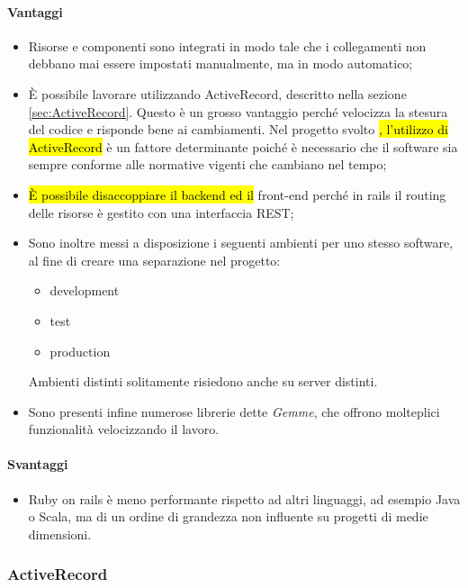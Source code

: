 \paragraph{Vantaggi}
\begin{itemize}
	\item Risorse e componenti sono integrati in modo tale che i collegamenti non debbano mai essere impostati manualmente, ma in modo automatico;
	\item È possibile lavorare utilizzando ActiveRecord, descritto nella sezione \ref{sec:ActiveRecord}. Questo è un grosso vantaggio perché velocizza la stesura del codice e risponde bene ai cambiamenti. Nel progetto svolto \hl{, l'utilizzo di ActiveRecord} è un fattore determinante poiché è necessario che il software sia sempre conforme alle normative vigenti che cambiano nel tempo;
	\item \hl{È possibile disaccoppiare il backend ed il} \gls{front-end} perché in rails il routing delle risorse è gestito con una interfaccia REST;
	\item Sono inoltre messi a disposizione i seguenti ambienti per uno stesso software, al fine di creare una separazione nel progetto:
		\begin{itemize}
		\item development 
		\item test
		\item production
		\end{itemize} 
		Ambienti distinti solitamente risiedono anche su server distinti.
	\item Sono presenti infine numerose librerie dette \textit{Gemme}, che offrono molteplici funzionalità velocizzando il lavoro.
\end{itemize}
\paragraph{Svantaggi}
	\begin{itemize}
		\item Ruby on rails è meno performante rispetto ad altri linguaggi, ad esempio Java o Scala, ma di un ordine di grandezza non influente su progetti di medie dimensioni. 
	\end{itemize} 
		
\subsubsection{ActiveRecord}

